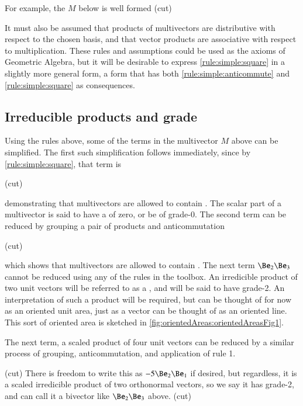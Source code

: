 
For example, the  \( M \) below is well formed
(cut)

It must also be assumed that products of multivectors are distributive with respect to the chosen basis, and that vector products are associative with respect to multiplication.
These rules and assumptions could be used as the axioms of Geometric Algebra, but it will be desirable to express \ref{rule:simple:square} in a slightly more general form, a form that has both \ref{rule:simple:anticommute} and \ref{rule:simple:square} as consequences.

\subsection{Irreducible products and grade}

Using the rules above, some of the terms in the multivector \( M \) above can be simplified.
The first such simplification follows immediately, since by \ref{rule:simple:square}, that term is

(cut)

demonstrating that multivectors are allowed to contain .
The scalar part of a multivector is said to have a  of zero, or be of grade-0.
The second term can be reduced by grouping a pair of products and anticommutation

(cut)

which shows that multivectors are allowed to contain .
The next term \( \Be_2 \Be_3 \) cannot be reduced using any of the rules in the toolbox.
An irredicible product of two unit vectors will be referred to as a , and will be said to have grade-2.
An interpretation of such a product will be required, but can be thought of for now as an oriented unit area, just as a vector can be thought of as an oriented line.
This sort of oriented area is sketched in
\cref{fig:orientedAreas:orientedAreasFig1}.


The next term, a scaled product of four unit vectors can be reduced by a similar process of grouping, anticommutation, and application of rule 1.

(cut)
There is freedom to write this as \( - 5 \Be_2 \Be_1 \) if desired, but regardless, it is a
scaled irredicible product of two orthonormal vectors, so we say it has grade-2, and can call it a bivector like \( \Be_2 \Be_3 \) above.
(cut)

